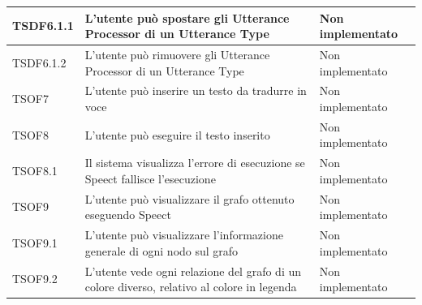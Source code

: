 \documentclass[openany,12pt,a4paper]{report}
\begin{document}
\begin{longtable}{| p{2cm} |p{5cm} | p{2.5cm} |}
	\newline TSDF6.1.1&
	\newline L'utente può spostare gli Utterance Processor di un Utterance Type&
	\newline Non implementato
	\\[1em]
	\hline	
	
	\newline TSDF6.1.2&
	\newline L'utente può rimuovere gli Utterance Processor di un Utterance Type&
	\newline Non implementato
	\\[1em]
	\hline	
	
	\newline TSOF7&
	\newline L'utente può inserire un testo da tradurre in voce&
	\newline Non implementato
	\\[1em]
	
	\hline
	\newline TSOF8&
	\newline L'utente può eseguire il testo inserito&
	\newline Non implementato
	\\[1em]
	\hline
	\newline TSOF8.1&
	\newline Il sistema visualizza l'errore di esecuzione se Speect fallisce l'esecuzione&
	\newline Non implementato
	\\[1em]
	\hline
	
	\newline TSOF9&
	\newline L'utente può visualizzare il grafo ottenuto eseguendo Speect&
	\newline Non implementato
	\\[1em]
	\hline
	
	
	\newline TSOF9.1&
	\newline L'utente può visualizzare l'informazione generale di ogni nodo sul grafo&
	\newline Non implementato
	\\[1em]
	\hline
	
	\newline TSOF9.2&
	\newline L'utente vede ogni relazione del grafo di un colore diverso, relativo al colore in legenda&
	\newline  Non implementato
	\\[1em]
	\hline
	

\end{longtable}
\end{document}
